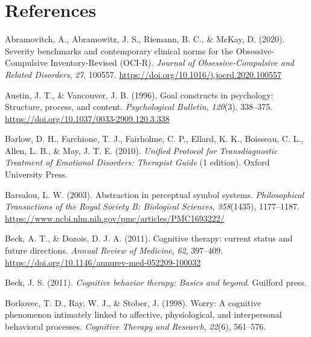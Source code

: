 \documentclass[
  man,floatsintext]{apa7}
\newlength{\cslhangindent}
\newlength{\cslentryspacingunit} %
\newenvironment{CSLReferences}[2] %
 {%
  \setlength{\parindent}{0pt}
  \ifodd #1
  \let\oldpar\par
  \def\par{\hangindent=\cslhangindent\oldpar}
  \fi
  \setlength{\parskip}{#2\cslentryspacingunit}
 }%
 {}
\begin{document}
\newpage

\section{References}\label{references}

\hypertarget{refs}{}
\begin{CSLReferences}{1}{0}
\leavevmode{}%
Abramovitch, A., Abramowitz, J. S., Riemann, B. C., \& McKay, D. (2020). Severity benchmarks and contemporary clinical norms for the Obsessive-Compulsive Inventory-Revised (OCI-R). \emph{Journal of Obsessive-Compulsive and Related Disorders}, \emph{27}, 100557. \url{https://doi.org/10.1016/j.jocrd.2020.100557}

\leavevmode{}%
Austin, J. T., \& Vancouver, J. B. (1996). Goal constructs in psychology: Structure, process, and content. \emph{Psychological Bulletin}, \emph{120}(3), 338--375. \url{https://doi.org/10.1037/0033-2909.120.3.338}

\leavevmode{}%
Barlow, D. H., Farchione, T. J., Fairholme, C. P., Ellard, K. K., Boisseau, C. L., Allen, L. B., \& May, J. T. E. (2010). \emph{Unified Protocol for Transdiagnostic Treatment of Emotional Disorders: Therapist Guide} (1 edition). Oxford University Press.

\leavevmode{}%
Barsalou, L. W. (2003). Abstraction in perceptual symbol systems. \emph{Philosophical Transactions of the Royal Society B: Biological Sciences}, \emph{358}(1435), 1177--1187. \url{https://www.ncbi.nlm.nih.gov/pmc/articles/PMC1693222/}

\leavevmode{}%
Beck, A. T., \& Dozois, D. J. A. (2011). Cognitive therapy: current status and future directions. \emph{Annual Review of Medicine}, \emph{62}, 397--409. \url{https://doi.org/10.1146/annurev-med-052209-100032}

\leavevmode{}%
Beck, J. S. (2011). \emph{Cognitive behavior therapy: Basics and beyond}. Guilford press.

\leavevmode{}%
Borkovec, T. D., Ray, W. J., \& Stober, J. (1998). Worry: A cognitive phenomenon intimately linked to affective, physiological, and interpersonal behavioral processes. \emph{Cognitive Therapy and Research}, \emph{22}(6), 561--576.


\end{CSLReferences}
\end{document}
